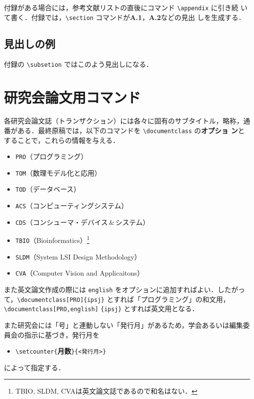 \documentclass[submit,techrep]{ipsj}
\def\|{\verb|}
\begin{document}
付録がある場合には，参考文献リストの直後にコマンド \|\appendix| に引き続
いて書く．付録では，\|\section| コマンドが{\bf A.1}，{\bf A.2}などの見出
しを生成する．

\subsection{見出しの例}

付録の \|\subsetion| ではこのよう見出しになる．

\section{研究会論文用コマンド}
\label{sig}

各研究会論文誌（トランザクション）には各々に固有のサブタイトル，略称，通
番がある．最終原稿では，以下のコマンドを \|\documentclass| の{\bf オプショ
ン}とすることで，これらの情報を与える．

\begin{itemize}
\item \|PRO|（プログラミング）
\item \|TOM|（数理モデル化と応用）
\item \|TOD|（データベース）
\item \|ACS|（コンピューティングシステム）
\item \|CDS|（コンシューマ・デバイス\,\&\,システム）
\item \|TBIO|（Bioinformatics）\footnote{%
TBIO, SLDM, CVAは英文論文誌であるので和名はない．}
\item \|SLDM|（System LSI Design Methodology）\footnotemark[5]
\item \|CVA|（Computer Vision and Applicaitons）\footnotemark[5]
\end{itemize}

また英文論文作成の際には \|english| をオプションに追加すればよい．したがっ
て，\|\documentclass[PRO]{ipsj}| とすれば「プログラミング」の和文用，
\|\documentclass[PRO,english]| \|{ipsj}| とすれば英文用となる．

また研究会には「号」と連動しない「発行月」があるため，学会あるいは編集委
員会の指示に基づき，発行月を
%
\begin{itemize}\item[]
\|\setcounter{|{\bf 月数}\|}{<発行月>}|
\end{itemize}
%
によって指定する．
\end{document}
